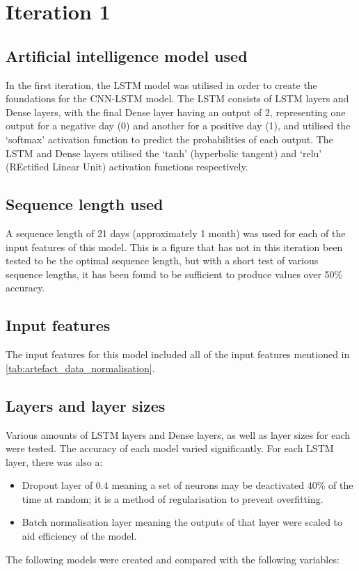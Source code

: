 \section{Iteration 1}
\subsection{Artificial intelligence model used}\label{ssec:iteration1_ai_model}
In the first iteration, the LSTM model was utilised in order to create the foundations for the CNN-LSTM model. The LSTM
consists of LSTM layers and Dense layers, with the final Dense layer having an output of 2, representing one output for
a negative day (0) and another for a positive day (1), and utilised the `softmax' activation function to predict the
probabilities of each output. The LSTM and Dense layers utilised the `tanh' (hyperbolic tangent) and `relu'
(REctified Linear Unit) activation functions respectively.

\subsection{Sequence length used}
A sequence length of 21 days (approximately 1 month) was used for each of the input features of this model.
This is a figure that has not in this iteration been tested to be the optimal sequence length, but with a short
test of various sequence lengths, it has been found to be sufficient to produce values over 50\% accuracy.
\subsection{Input features}
The input features for this model included all of the input features mentioned in \autoref{tab:artefact_data_normalisation}.

\subsection{Layers and layer sizes} \label{ssec:iteration1layers}
Various amounts of LSTM layers and Dense layers, as well as layer sizes for each were tested. The accuracy of each model varied
significantly. For each LSTM layer, there was also a:
\begin{itemize}
    \item Dropout layer of 0.4 meaning a set of neurons may be
    deactivated 40\% of the time at random; it is a method of regularisation to prevent overfitting.
    \item Batch normalisation layer meaning the outputs of that layer were scaled to aid efficiency of the model.
\end{itemize}
The following models were created and compared with the following variables:

